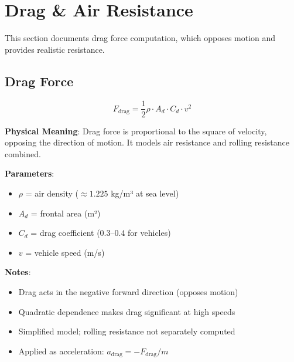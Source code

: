 \section{Drag \& Air Resistance}

This section documents drag force computation, which opposes motion and provides realistic resistance.

\subsection{Drag Force}

\begin{equation}
  F_{\text{drag}} = \frac{1}{2} \rho \cdot A_d \cdot C_d \cdot v^2
  \label{eq:drag-force}
\end{equation}

\textbf{Physical Meaning}: Drag force is proportional to the square of velocity, opposing the direction of motion. It models air resistance and rolling resistance combined.

\textbf{Parameters}:
\begin{itemize}
  \item $\rho$ = air density ($\approx 1.225$ kg/m³ at sea level)
  \item $A_d$ = frontal area (m²)
  \item $C_d$ = drag coefficient (0.3–0.4 for vehicles)
  \item $v$ = vehicle speed (m/s)
\end{itemize}

\textbf{Notes}:
\begin{itemize}
  \item Drag acts in the negative forward direction (opposes motion)
  \item Quadratic dependence makes drag significant at high speeds
  \item Simplified model; rolling resistance not separately computed
  \item Applied as acceleration: $a_{\text{drag}} = -F_{\text{drag}} / m$
\end{itemize}

\newpage
